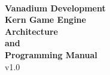 \documentclass{article}
\begin{document}
    \vspace*{\fill}
    \begin{center}
        \huge\textbf{Vanadium Development\textsuperscript{\large \textregistered}}
        \\[.25\baselineskip]
        \huge\textbf{Kern Game Engine}\\[.5\baselineskip]
        \Huge\textbf{Architecture\\and\\Programming Manual}\\[.25\baselineskip]
        \Huge{v1.0}
    \end{center}
    \vspace*{\fill}
\end{document}
